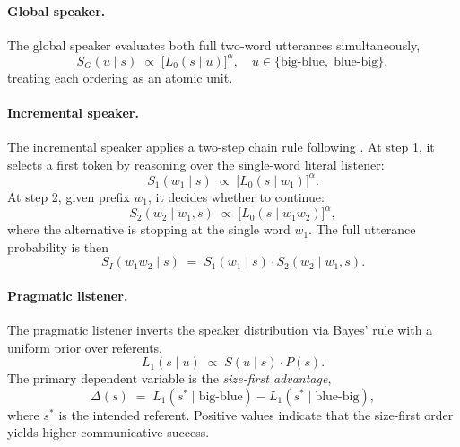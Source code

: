 \paragraph{Global speaker.}
The global speaker evaluates both full two-word utterances simultaneously,
\begin{equation}
  S_G(u \mid s) \;\propto\; \bigl[L_0(s \mid u)\bigr]^\alpha,
  \quad u \in \{\text{big-blue},\; \text{blue-big}\},
\end{equation}
treating each ordering as an atomic unit.

\paragraph{Incremental speaker.}
The incremental speaker applies a two-step chain rule
following .
At step 1, it selects a first token by reasoning over the single-word
literal listener:
\begin{equation}
  S_1(w_1 \mid s)
    \;\propto\; \bigl[L_0(s \mid w_1)\bigr]^\alpha.
\end{equation}
At step 2, given prefix $w_1$, it decides whether to continue:
\begin{equation}
  S_2(w_2 \mid w_1, s)
    \;\propto\; \bigl[L_0(s \mid w_1 w_2)\bigr]^\alpha,
\end{equation}
where the alternative is stopping at the single word $w_1$.
The full utterance probability is then
\begin{equation}
  S_I(w_1 w_2 \mid s) \;=\; S_1(w_1 \mid s) \cdot S_2(w_2 \mid w_1, s).
  \label{eq:inc-chain}
\end{equation}

\paragraph{Pragmatic listener.}
The pragmatic listener inverts the speaker distribution via Bayes' rule
with a uniform prior over referents,
\begin{equation}
  L_1(s \mid u) \;\propto\; S(u \mid s) \cdot P(s).
\end{equation}
The primary dependent variable is the \textit{size-first advantage},
\begin{equation}
  \Delta(s) \;=\;
  L_1(s^* \mid \text{big-blue}) - L_1(s^* \mid \text{blue-big}),
\end{equation}
where $s^*$ is the intended referent.
Positive values indicate that the size-first order yields higher
communicative success.


